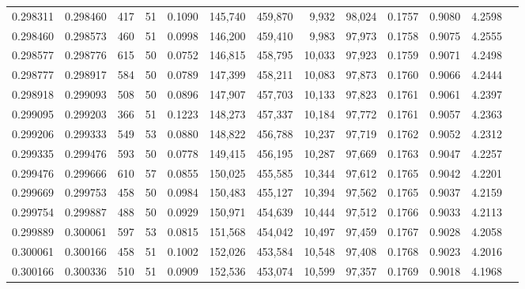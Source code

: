 \begin{tabular}{rrrrrrrrrrrrr}
0.298311 & 0.298460 &   417 &  51 &                                     0.1090 & 145,740 & 459,870 &   9,932 &  98,024 & 0.1757 & 0.9080 & 4.2598 \\
0.298460 & 0.298573 &   460 &  51 &                                     0.0998 & 146,200 & 459,410 &   9,983 &  97,973 & 0.1758 & 0.9075 & 4.2555 \\
0.298577 & 0.298776 &   615 &  50 &                                     0.0752 & 146,815 & 458,795 &  10,033 &  97,923 & 0.1759 & 0.9071 & 4.2498 \\
0.298777 & 0.298917 &   584 &  50 &                                     0.0789 & 147,399 & 458,211 &  10,083 &  97,873 & 0.1760 & 0.9066 & 4.2444 \\
0.298918 & 0.299093 &   508 &  50 &                                     0.0896 & 147,907 & 457,703 &  10,133 &  97,823 & 0.1761 & 0.9061 & 4.2397 \\
0.299095 & 0.299203 &   366 &  51 &                                     0.1223 & 148,273 & 457,337 &  10,184 &  97,772 & 0.1761 & 0.9057 & 4.2363 \\
0.299206 & 0.299333 &   549 &  53 &                                     0.0880 & 148,822 & 456,788 &  10,237 &  97,719 & 0.1762 & 0.9052 & 4.2312 \\
0.299335 & 0.299476 &   593 &  50 &                                     0.0778 & 149,415 & 456,195 &  10,287 &  97,669 & 0.1763 & 0.9047 & 4.2257 \\
0.299476 & 0.299666 &   610 &  57 &                                     0.0855 & 150,025 & 455,585 &  10,344 &  97,612 & 0.1765 & 0.9042 & 4.2201 \\
0.299669 & 0.299753 &   458 &  50 &                                     0.0984 & 150,483 & 455,127 &  10,394 &  97,562 & 0.1765 & 0.9037 & 4.2159 \\
0.299754 & 0.299887 &   488 &  50 &                                     0.0929 & 150,971 & 454,639 &  10,444 &  97,512 & 0.1766 & 0.9033 & 4.2113 \\
0.299889 & 0.300061 &   597 &  53 &                                     0.0815 & 151,568 & 454,042 &  10,497 &  97,459 & 0.1767 & 0.9028 & 4.2058 \\
0.300061 & 0.300166 &   458 &  51 &                                     0.1002 & 152,026 & 453,584 &  10,548 &  97,408 & 0.1768 & 0.9023 & 4.2016 \\
0.300166 & 0.300336 &   510 &  51 &                                     0.0909 & 152,536 & 453,074 &  10,599 &  97,357 & 0.1769 & 0.9018 & 4.1968 \\

\end{tabular}
